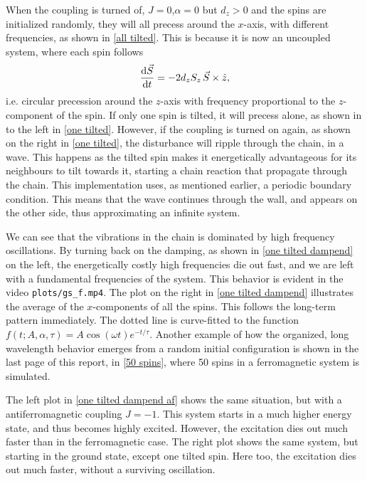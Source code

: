\documentclass{article}
\begin{document}
    When the coupling is turned of, $J = 0$,$\alpha=0$ but $d_z>0$ and the spins are initialized randomly, they will all precess around the $x$-axis, with different frequencies, as shown in \autoref{all tilted}.
    This is because it is now an uncoupled system, where each spin follows 
    \begin{equation*}
        \dv{\vec S}{t} = - 2 d_z S_z \,\vec S \times \hat z, 
    \end{equation*}
    i.e.
    circular precession around the $z$-axis with frequency proportional to the $z$-component of the spin.
    If only one spin is tilted, it will precess alone, as shown in to the left in \autoref{one tilted}.
    However, if the coupling is turned on again, as shown on the right in \autoref{one tilted}, the disturbance will ripple through the chain, in a wave.
    This happens as the tilted spin makes it energetically advantageous for its neighbours to tilt towards it, starting a chain reaction that propagate through the chain. This implementation uses, as mentioned earlier, a periodic boundary condition. This means that the wave continues through the wall, and appears on the other side, thus approximating an infinite system.

    We can see that the vibrations in the chain is dominated by high frequency oscillations.
    By turning back on the damping, as shown in \autoref{one tilted dampend} on the left, the energetically costly high frequencies die out fast, and we are left with a fundamental frequencies of the system.
    This behavior is evident in the video \verb|plots/gs_f.mp4|.
    The plot on the right in \autoref{one tilted dampend} illustrates the average of the $x$-components of all the spins.
    This follows the long-term pattern immediately.
    The dotted line is curve-fitted to the function $f(t; A, \alpha, \tau) = A \cos(\omega t) e^{-t/\tau}$.
    Another example of how the organized, long wavelength behavior emerges from a random initial configuration is shown in the last page of this report, in \autoref{50 spins}, where 50 spins in a ferromagnetic system is simulated.

    The left plot in \autoref{one tilted dampend af} shows the same situation, but with a antiferromagnetic coupling $J = -1$.
    This system starts in a much higher energy state, and thus becomes highly excited.
    However, the excitation dies out much faster than in the ferromagnetic case.
    The right plot shows the same system, but starting in the ground state, except one tilted spin.
    Here too, the excitation dies out much faster, without a surviving oscillation.
\end{document}
